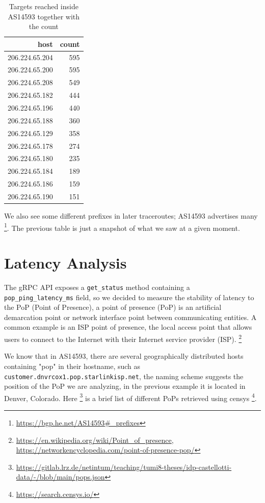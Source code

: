 \documentclass[IN,11pt,twoside,openright,idp,english]{tumthesis}
\begin{document}
\begin{table}
    \centering
    \begin{tabular}{ r r }
        \toprule
            host           & count \\ 
            \midrule
            206.224.65.204 & 595   \\
            206.224.65.200 & 595   \\
            206.224.65.208 & 549   \\ 
            206.224.65.182 & 444   \\
            206.224.65.196 & 440   \\ 
            206.224.65.188 & 360   \\ 
            206.224.65.129 & 358   \\ 
            206.224.65.178 & 274   \\ 
            206.224.65.180 & 235   \\ 
            206.224.65.184 & 189   \\ 
            206.224.65.186 & 159   \\ 
            206.224.65.190 & 151   \\
            \bottomrule
    \end{tabular}
    \caption{Targets reached inside AS14593 together with the count}
\end{table}

We also see some different prefixes in later traceroutes; AS14593 advertises many \footnote{\url{https://bgp.he.net/AS14593\#_prefixes}}. The previous table is just a snapshot of what we saw at a given moment.
    
\section{Latency Analysis}

The gRPC API exposes a \texttt{get\_status} method containing a \texttt{pop\_ping\_latency\_ms} field, so we decided to measure the stability of latency to the PoP (Point of Presence), a point of presence (PoP) is an artificial demarcation point or network interface point between communicating entities. A common example is an ISP point of presence, the local access point that allows users to connect to the Internet with their Internet service provider (ISP). \footnote{\url{https://en.wikipedia.org/wiki/Point_of_presence}, \url{https://networkencyclopedia.com/point-of-presence-pop/}}

We know that in AS14593, there are several geographically distributed hosts containing "pop" in their hostname, such as \texttt{customer.dnvrcox1.pop.starlinkisp.net}, the naming scheme suggests the position of the PoP we are analyzing, in the previous example it is located in Denver, Colorado. Here \footnote{\url{https://gitlab.lrz.de/netintum/teaching/tumi8-theses/idp-castellotti-data/-/blob/main/pops.json}} is a brief list of different PoPs retrieved using censys \footnote{\url{https://search.censys.io/}}.
\end{document}
